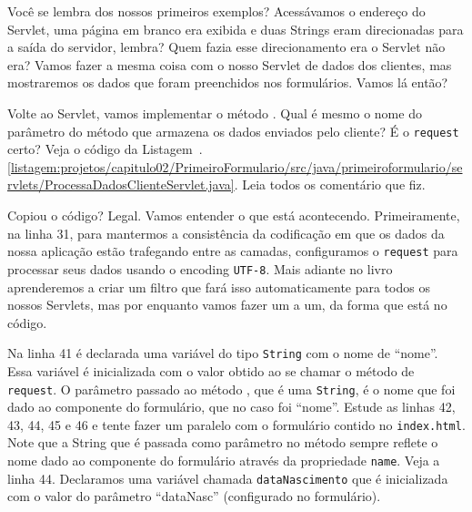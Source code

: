 Você se lembra dos nossos primeiros exemplos? Acessávamos o endereço do Servlet, uma página em branco era exibida e duas Strings eram direcionadas para a saída do servidor, lembra? Quem fazia esse direcionamento era o Servlet não era? Vamos fazer a mesma coisa com o nosso Servlet de dados dos clientes, mas mostraremos os dados que foram preenchidos nos formulários. Vamos lá então?

Volte ao Servlet, vamos implementar o método . Qual é mesmo o nome do parâmetro do método  que armazena os dados enviados pelo cliente? É o \texttt{request} certo? Veja o código da Listagem~\thechapter.\ref{listagem:projetos/capitulo02/PrimeiroFormulario/src/java/primeiroformulario/servlets/ProcessaDadosClienteServlet.java}. Leia todos os comentário que fiz.


Copiou o código? Legal. Vamos entender o que está acontecendo. Primeiramente, na linha 31, para mantermos a consistência da codificação em que os dados da nossa aplicação estão trafegando entre as camadas, configuramos o \texttt{request} para processar seus dados usando o encoding \texttt{UTF-8}. Mais adiante no livro aprenderemos a criar um filtro que fará isso automaticamente para todos os nossos Servlets, mas por enquanto vamos fazer um a um, da forma que está no código.

Na linha 41 é declarada uma variável do tipo \texttt{String} com o nome de ``nome''. Essa variável é inicializada com o valor obtido ao se chamar o método\linebreak%
 de \texttt{request}. O parâmetro passado ao método , que é uma \texttt{String}, é o nome que foi dado ao componente do formulário, que no caso foi ``nome''. Estude as linhas 42, 43, 44, 45 e 46 e tente fazer um paralelo com o formulário contido no \texttt{index.html}. Note que a String que é passada como parâmetro no método  sempre reflete o nome dado ao componente do formulário através da propriedade \texttt{name}. Veja a linha 44. Declaramos uma variável chamada \texttt{dataNascimento} que é inicializada com o valor do parâmetro ``dataNasc'' (configurado no formulário).


